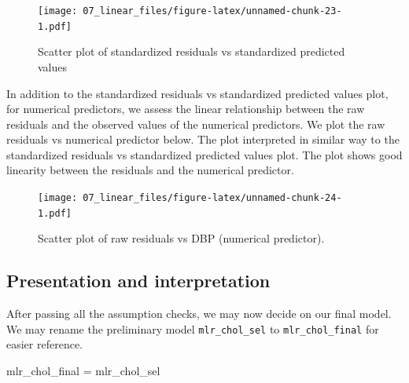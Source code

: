 \documentclass[
  10pt,
]{krantz}
\newenvironment{Shaded}{\begin{snugshade}}{\end{snugshade}}
\newcommand{\AttributeTok}[1]{\textcolor[rgb]{0.77,0.63,0.00}{#1}}
\newcommand{\DecValTok}[1]{\textcolor[rgb]{0.00,0.00,0.81}{#1}}
\newcommand{\FunctionTok}[1]{\textcolor[rgb]{0.00,0.00,0.00}{#1}}
\newcommand{\NormalTok}[1]{#1}
\newcommand{\OtherTok}[1]{\textcolor[rgb]{0.56,0.35,0.01}{#1}}
\newcommand{\SpecialCharTok}[1]{\textcolor[rgb]{0.00,0.00,0.00}{#1}}
\newcommand{\StringTok}[1]{\textcolor[rgb]{0.31,0.60,0.02}{#1}}
\begin{document}
\begin{figure}
\centering
\texttt{[image: 07\_linear\_files/figure-latex/unnamed-chunk-23-1.pdf]}
\caption{\label{fig:unnamed-chunk-23}Scatter plot of standardized residuals vs standardized predicted values}
\end{figure}

In addition to the standardized residuals vs standardized predicted values plot, for numerical predictors, we assess the linear relationship between the raw residuals and the observed values of the numerical predictors. We plot the raw residuals vs numerical predictor below. The plot interpreted in similar way to the standardized residuals vs standardized predicted values plot. The plot shows good linearity between the residuals and the numerical predictor.

\begin{Shaded}
\end{Shaded}

\begin{figure}
\centering
\texttt{[image: 07\_linear\_files/figure-latex/unnamed-chunk-24-1.pdf]}
\caption{\label{fig:unnamed-chunk-24}Scatter plot of raw residuals vs DBP (numerical predictor).}
\end{figure}

\hypertarget{presentation-and-interpretation-1}{%
\subsection{Presentation and interpretation}\label{presentation-and-interpretation-1}}

After passing all the assumption checks, we may now decide on our final model. We may rename the preliminary model \texttt{mlr\_chol\_sel} to \texttt{mlr\_chol\_final} for easier reference.

\begin{Shaded}
\begin{Highlighting}[]
\NormalTok{mlr\_chol\_final }\OtherTok{=}\NormalTok{ mlr\_chol\_sel}
\end{Highlighting}
\end{Shaded}
\end{document}
